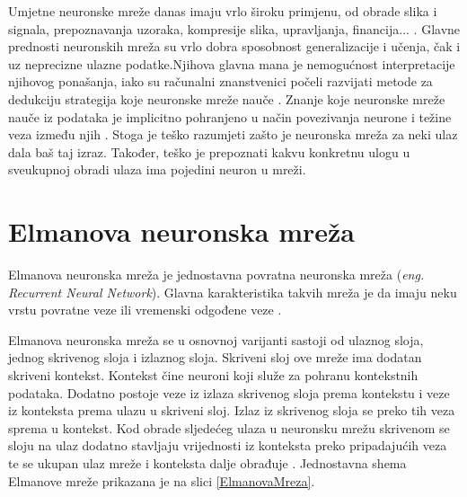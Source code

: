 \documentclass[zavrsnirad]{fer}
\begin{document}
	Umjetne neuronske mreže danas imaju vrlo široku primjenu, od obrade slika i signala, prepoznavanja uzoraka, kompresije slika, upravljanja, financija... \cite{skriptaNeuronskeMreze}. Glavne prednosti neuronskih mreža su vrlo dobra sposobnost generalizacije i učenja, čak i uz neprecizne ulazne podatke.Njihova glavna mana je nemogućnost interpretacije njihovog ponašanja, iako su računalni znanstvenici počeli razvijati metode za dedukciju strategija koje neuronske mreže nauče \cite{MITNeuralNet}. Znanje koje neuronske mreže nauče iz podataka je implicitno pohranjeno u način povezivanja neurone i težine veza između njih \cite{skriptaNeuronskeMreze}. Stoga je teško razumjeti zašto je neuronska mreža za neki ulaz dala baš taj izraz. Također, teško je prepoznati kakvu konkretnu ulogu u sveukupnoj obradi ulaza ima pojedini neuron u mreži.
	
	\section{Elmanova neuronska mreža}
	\label{pog:ElmanovaMreza}
	
		Elmanova neuronska mreža je jednostavna povratna neuronska mreža (\textit{eng. Recurrent Neural Network}). Glavna karakteristika takvih mreža je da imaju neku vrstu povratne veze ili vremenski odgođene veze \cite{ElmanNetSite}.
		
		Elmanova neuronska mreža se u osnovnoj varijanti sastoji od ulaznog sloja, jednog skrivenog sloja i izlaznog sloja. Skriveni sloj ove mreže ima dodatan skriveni kontekst. Kontekst čine neuroni koji služe za pohranu kontekstnih podataka. Dodatno postoje veze iz izlaza skrivenog sloja prema kontekstu i veze iz konteksta prema ulazu u skriveni sloj. Izlaz iz skrivenog sloja se preko tih veza sprema u kontekst. Kod obrade sljedećeg ulaza u neuronsku mrežu skrivenom se sloju na ulaz dodatno stavljaju vrijednosti iz konteksta preko pripadajućih veza te se ukupan ulaz mreže i konteksta dalje obrađuje \cite{Elman}. Jednostavna shema Elmanove mreže prikazana je na slici \ref{ElmanovaMreza}.
		
\end{document}
